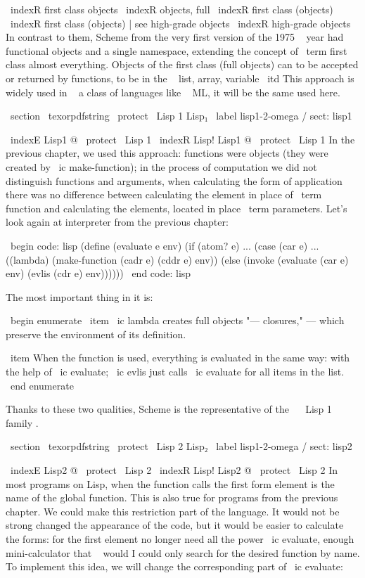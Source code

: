 {\ indexR {first class objects}
\ indexR {objects, full}
\ indexR {first class (objects)}
\ indexR {first class (objects) | see {high-grade objects}}
\ indexR {high-grade objects}
In contrast to them, Scheme from the very first version of the 1975 ~ year had functional
objects and a single namespace, extending the concept of \ term {first class}
almost everything. Objects of the first class (full objects) can
to be accepted or returned by functions, to be in the ~ list, array, variable
{ \ itd } This approach is widely used in ~ a class of languages ​​like ~ ML, it will be the same
used here.


\ section { \ texorpdfstring { \ protect \ Lisp 1} {Lisp₁}} \ label {lisp1-2-omega / sect: lisp1}

\ indexE {Lisp1 @ \ protect \ Lisp 1}
\ indexR {Lisp! Lisp1 @ \ protect \ Lisp 1}
In the previous chapter, we used this approach: functions were objects
(they were created by \ ic {make-function}); in the process of computation we did not distinguish
functions and arguments, when calculating the form of application there was no difference
between calculating the element in place of \ term {function} and calculating the elements,
located in place \ term {parameters}. Let's look again at
interpreter from the previous chapter:

\ begin {code: lisp}
(define (evaluate e env)
  (if (atom? e) ...
      (case (car e)
        ...
        ((lambda) (make-function (cadr e) (cddr e) env))
        (else (invoke (evaluate (car e) env)
                      (evlis (cdr e) env))))))
\ end {code: lisp}

The most important thing in it is:

\ begin {enumerate}
  \ item  \ ic {lambda} creates full objects "--- closures," ---
        which preserve the environment of its definition.

  \ item When the function is used, everything is evaluated in the same way:
        with the help of \ ic {evaluate}; \ ic {evlis} just calls
        \ ic {evaluate} for all items in the list.
\ end {enumerate}

Thanks to these two qualities, Scheme is the representative of the ~ \ Lisp 1 family .


\ section { \ texorpdfstring { \ protect \ Lisp 2} {Lisp₂}} \ label {lisp1-2-omega / sect: lisp2}

\ indexE {Lisp2 @ \ protect \ Lisp 2}
\ indexR {Lisp! Lisp2 @ \ protect \ Lisp 2}
In most programs on Lisp, when the function calls the first form element
is the name of the global function. This is also true for programs from the previous
chapter. We could make this restriction part of the language. It would not be ~ strong
changed the appearance of the code, but it would be easier to calculate the forms: for the first element
no longer need all the power \ ic {evaluate}, enough mini-calculator that ~ would
I could only search for the desired function by name. To implement this idea, we will change
the corresponding part of \ ic {evaluate}:

}
